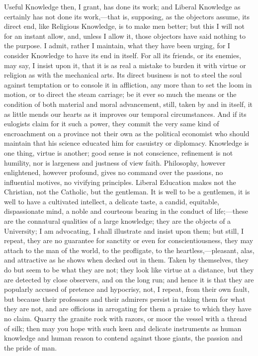 Useful Knowledge then, I grant, has done its work; and
Liberal Knowledge as certainly has not done its work,—that is,
supposing, as the objectors assume, its direct end, like Religious
Knowledge, is to make men better; but this I will not for an instant
allow, and, unless I allow it, those objectors have said nothing to
the purpose. I admit, rather I maintain, what they have been urging,
for I consider Knowledge to have its end in itself. For all its
friends, or its enemies, may say, I insist upon it, that it is as real
a mistake to burden it with virtue or religion as with the mechanical
arts. Its direct business is not to steel the soul against temptation
or to console it in affliction, any more than to set the loom in
motion, or to direct the steam carriage; be it ever so much the means
or the condition of both material and moral advancement, still, taken
by and in itself, it as little mends our hearts as it improves our
temporal circumstances. And if its eulogists claim for it such a
power, they commit the very same kind of encroachment on a province
not their own as the political economist who should maintain that his
science educated him for casuistry or diplomacy. Knowledge is one
thing, virtue is another; good sense is not conscience, refinement is
not humility, nor is largeness and justness of view faith. Philosophy,
however enlightened, however profound, gives no command over the
passions, no influential motives, no vivifying principles. Liberal
Education makes not the Christian, not the Catholic, but the
gentleman. It is well to be a gentlemen, it is well to have a
cultivated intellect, a delicate taste, a candid, equitable,
dispassionate mind, a noble and courteous bearing in the conduct of
life;—these are the connatural qualities of a large knowledge;
they are the objects of a University; I am advocating, I shall
illustrate and insist upon them; but still, I repeat, they are no
guarantee for sanctity or even for conscientiousness, they may attach
to the man of the world, to the profligate, to the heartless,—pleasant,
alas, and attractive as he shows when decked out in them. Taken by
themselves, they do but seem to be what they are not; they look like
virtue at a distance, but they are detected by close observers, and on
the long run; and hence it is that they are popularly accused of
pretence and hypocrisy, not, I repeat, from their own fault, but
because their professors and their admirers persist in taking them for
what they are not, and are officious in arrogating for them a praise
to which they have no claim. Quarry the granite rock with razors, or
moor the vessel with a thread of silk; then may you hope with such
keen and delicate instruments as human knowledge and human reason to
contend against those giants, the passion and the pride of man.

